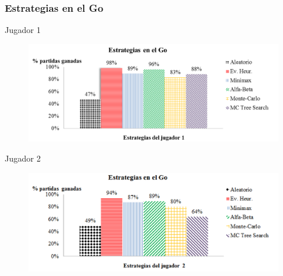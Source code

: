 \documentclass[10pt]{beamer}
\begin{document}
\begin{frame}[t]
\frametitle{Estrategias en el Go}
{\large Jugador 1}
\begin{figure}[t]
\centering
\includegraphics[scale=0.2]{imagenes/estrategiasGo1.png}
\label{fig:estrategiasGo1}
\end{figure}

{\large Jugador 2}
\begin{figure}[t]
\centering
\includegraphics[scale=0.2]{imagenes/estrategiasGo2.png}
\label{fig:estrategiasGo2}
\end{figure}
\end{frame}
\end{document}

